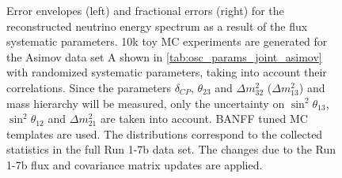 \begin{figure}[htb]
\caption {
Error envelopes (left) and fractional errors (right) for the reconstructed neutrino energy spectrum
as a result of the flux systematic parameters.
10k toy MC experiments are generated for the Asimov data set A shown in \cref{tab:osc_params_joint_asimov}
with randomized systematic parameters, taking into account their correlations.
Since the parameters $\delta_{CP}$, $\theta_{23}$ and $\Delta m^2_{32}$ ($\Delta m^2_{13}$) and mass hierarchy
will be measured,
only the uncertainty on 
$\sin^2 \theta_{13}$,
$\sin^2 \theta_{12}$
and 
$\Delta m^2_{21}$ 
are taken into account.
BANFF tuned MC templates are used. 
The distributions correspond to the collected statistics in the full Run 1-7b data set.
The changes due to the Run 1-7b flux and covariance matrix updates are applied.
}
\label{fig:flux_envelope_Asimov_A_run17b}
\end{figure}


